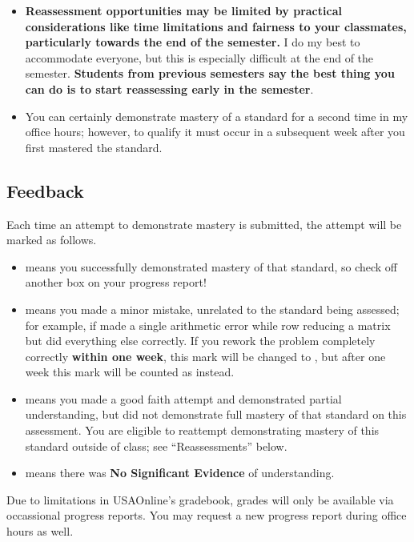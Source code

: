 {\begin{enumerate}[1)]
\begin{itemize}
    \item \textbf{Reassessment opportunities may be limited by practical considerations like time limitations and fairness to your classmates, particularly towards the end of the semester.}  I do my best to accommodate everyone, but this is especially difficult at the end of the semester.  {\bf Students from previous semesters say the best thing you can do is to start reassessing early in the semester}.
    \item You can certainly demonstrate mastery of a standard for a second time in my office hours; however, to qualify it must occur in a subsequent week after you first mastered the standard.
    \end{itemize}
    \end{enumerate}
}{
    \subsection*{\fontsize{10}{12}\selectfont Feedback}
    Each time an attempt to demonstrate mastery is submitted, the attempt will be marked as follows.
    \begin{itemize}
    \item \masteryMark{} means you successfully demonstrated mastery of that standard, so check off another box on your progress report!
    \item \minorMark{} means you made a minor mistake, unrelated to the standard being assessed; for example, if made a single arithmetic error while row reducing a matrix but did everything else correctly. If you rework the problem completely correctly \textbf{within one week}, this mark will be changed to \masteryMark{}, but after one week this mark will be counted as \reattemptMark{} instead.
    \item \reattemptMark{} means you made a good faith attempt and demonstrated partial understanding, but did not demonstrate full mastery of that standard on this assessment. You are eligible to reattempt demonstrating mastery of this standard outside of class; see ``Reassessments'' below.
    \item \noMark{} means there was {\bf No Significant Evidence} of understanding.
    \end{itemize}
    Due to limitations in USAOnline's gradebook, grades will only be available via occassional progress reports. You may request a new progress report during office hours as well.


}
